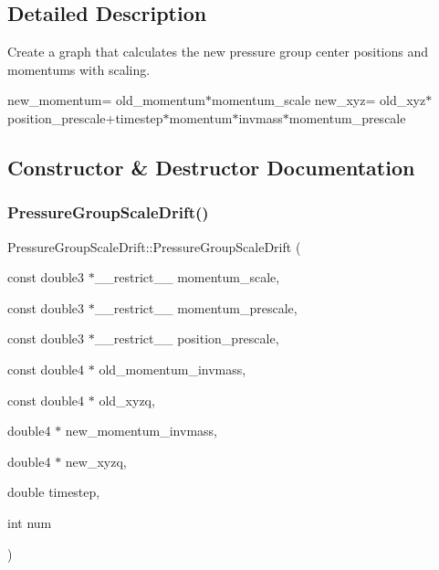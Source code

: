 \subsection{Detailed Description}
Create a graph that calculates the new pressure group center positions and momentums with scaling. 

new\+\_\+momentum= old\+\_\+momentum$\ast$momentum\+\_\+scale new\+\_\+xyz= old\+\_\+xyz$\ast$position\+\_\+prescale+timestep$\ast$momentum$\ast$invmass$\ast$momentum\+\_\+prescale 

\subsection{Constructor \& Destructor Documentation}
\hypertarget{classPressureGroupScaleDrift_a8cf59e5fe7570632084b614bd2000790}{}\label{classPressureGroupScaleDrift_a8cf59e5fe7570632084b614bd2000790} 
\subsubsection{\texorpdfstring{Pressure\+Group\+Scale\+Drift()}{PressureGroupScaleDrift()}}
{\footnotesize\ttfamily Pressure\+Group\+Scale\+Drift\+::\+Pressure\+Group\+Scale\+Drift (\begin{DoxyParamCaption}\item[{const double3 $\ast$\+\_\+\+\_\+restrict\+\_\+\+\_\+}]{momentum\+\_\+scale,  }\item[{const double3 $\ast$\+\_\+\+\_\+restrict\+\_\+\+\_\+}]{momentum\+\_\+prescale,  }\item[{const double3 $\ast$\+\_\+\+\_\+restrict\+\_\+\+\_\+}]{position\+\_\+prescale,  }\item[{const double4 $\ast$}]{old\+\_\+momentum\+\_\+invmass,  }\item[{const double4 $\ast$}]{old\+\_\+xyzq,  }\item[{double4 $\ast$}]{new\+\_\+momentum\+\_\+invmass,  }\item[{double4 $\ast$}]{new\+\_\+xyzq,  }\item[{double}]{timestep,  }\item[{int}]{num }\end{DoxyParamCaption})}



